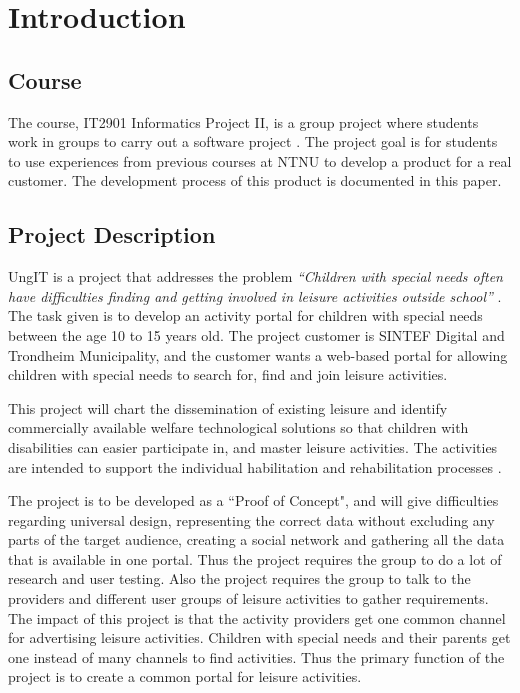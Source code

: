 
\chapter{Introduction}

\section{Course}
The course, IT2901 Informatics Project II, is a group project where students work in groups to carry out a software project \cite{EmneKode}. The project goal is for students to use experiences from previous courses at NTNU to develop a product for a real customer. The development process of this product is documented in this paper.


\section{Project Description}
UngIT is a project that addresses the problem \textit{“Children with special needs often have difficulties finding and getting involved in leisure activities outside school”} \cite{SintefBachelorProjectDescription}. The task given is to develop an activity portal for children with special needs between the age 10 to 15 years old. The project customer is SINTEF Digital and Trondheim Municipality, and the customer wants a web-based portal for allowing children with special needs to search for, find and join leisure activities.  

This project will chart the dissemination of existing leisure and identify commercially available welfare technological solutions so that children with disabilities can easier participate in, and master leisure activities. The activities are intended to support the individual habilitation and rehabilitation processes \cite{SintefOnlineProjectDescription}.

The project is to be developed as a “Proof of Concept", and will give difficulties regarding universal design, representing the correct data without excluding any parts of the target audience, creating a social network and gathering all the data that is available in one portal. Thus the project requires the group to do a lot of research and user testing. Also the project requires the group to talk to the providers and different user groups of leisure activities to gather requirements. The impact of this project is that the activity providers get one common channel for advertising leisure activities. Children with special needs and their parents get one instead of many channels to find activities. Thus the primary function of the project is to create a common portal for leisure activities.

